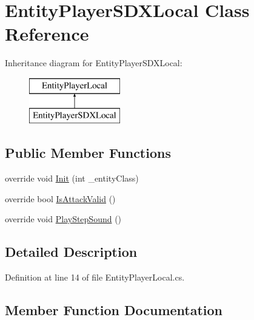 \hypertarget{class_entity_player_s_d_x_local}{}\section{Entity\+Player\+S\+D\+X\+Local Class Reference}
\label{class_entity_player_s_d_x_local}
Inheritance diagram for Entity\+Player\+S\+D\+X\+Local\+:\begin{figure}[H]
\begin{center}
\leavevmode
\includegraphics[height=2.000000cm]{d4/d4d/class_entity_player_s_d_x_local}
\end{center}
\end{figure}
\subsection*{Public Member Functions}
\begin{DoxyCompactItemize}
\item 
override void \mbox{\hyperlink{class_entity_player_s_d_x_local_ad0f75f7aac5777a74ce88d62d1997c89}{Init}} (int \+\_\+entity\+Class)
\item 
override bool \mbox{\hyperlink{class_entity_player_s_d_x_local_a389bd4d43007414092ca71759ccded49}{Is\+Attack\+Valid}} ()
\item 
override void \mbox{\hyperlink{class_entity_player_s_d_x_local_ae9ed4a028520ad3da3f8862ad46de878}{Play\+Step\+Sound}} ()
\end{DoxyCompactItemize}


\subsection{Detailed Description}


Definition at line 14 of file Entity\+Player\+Local.\+cs.



\subsection{Member Function Documentation}
\mbox{\label{class_entity_player_s_d_x_local_ad0f75f7aac5777a74ce88d62d1997c89}} 
